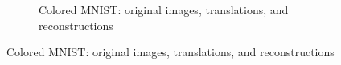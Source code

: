 \documentclass{article}
\begin{document}
\begin{enumerate}
\begin{figure}[H]
\begin{subfigure}{0.5\textwidth}
        \caption{Colored MNIST: original images, translations, and reconstructions}
    \end{subfigure}
\end{figure}
\end{enumerate}
\end{document}
